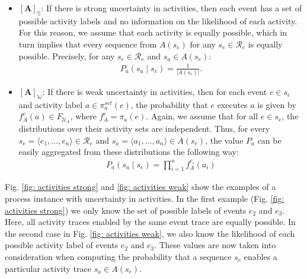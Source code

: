 \begin{itemize}
\item
$\boldsymbol{[A]_{\mathbb{S}}}$:
If there is strong uncertainty in activities, then each event has a set of possible activity labels and no information on the likelihood of each activity.
For this reason, we assume that each activity is equally possible, which in turn implies that every sequence from $A(s_e)$ for any $s_e \in \mathcal{R}_e$ is equally possible.
Precisely, for any $s_e \in \mathcal{R}_e$ and $s_a \in A(s_e)$:
\begin{align*}
P_a(s_a \mid s_e) = \frac{1}{|A(s_e)|}.
\end{align*}

\item
$\boldsymbol{[A]_{\mathbb{W}}}$:
If there is weak uncertainty in activities, then for each event $e \in s_e$ and activity label $a \in \pi_a^{set}(e)$, the probability that $e$ executes $a$ is given by $f_A^e(a) \in F_{\mathcal{U}_A}$, where $f_A^e = \pi_a(e)$.
Again, we assume that for all $e \in s_e$, the distributions over their activity sets are independent.
Thus, for every $s_e=\langle e_1,...,e_n \rangle \in \mathcal{R}_e$ and $s_a = \langle a_1,...,a_n \rangle \in A(s_e)$, the value $P_a$ can be easily aggregated from these distributions the following way:
\begin{align*}
P_a(s_a \mid s_e) = \prod_{i=1}^{n} f_A^{e_i}(a_i) 
\end{align*}
\end{itemize}
Fig. \ref{fig: activities strong} and \ref{fig: activities weak} show the examples of a process instance with uncertainty in activities.
In the first example (Fig. \ref{fig: activities strong}) we only know the set of possible labels of events $e_2$ and $e_3$.
Here, all activity traces enabled by the same event trace are equally possible.
In the second case in Fig. \ref{fig: activities weak}, we also know the likelihood of each possible activity label of events $e_2$ and $e_3$.
These values are now taken into consideration when computing the probability that a sequence $s_e$ enables a particular activity trace $s_a \in A(s_e)$.
%
%
%
%
%
